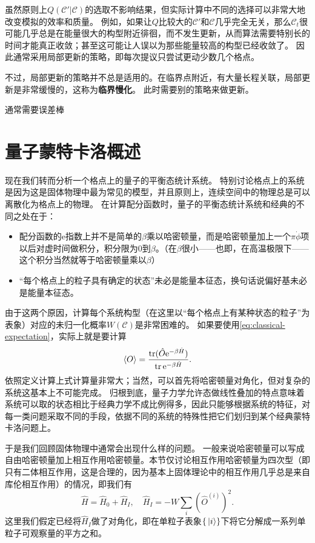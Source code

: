 \documentclass[hyperref, UTF8, a4paper]{ctexart}
\newcommand*{\ee}{\mathrm{e}}
\begin{document}
虽然原则上$Q(\mathcal{C}' | \mathcal{C})$的选取不影响结果，但实际计算中不同的选择可以非常大地改变模拟的效率和质量。
例如，如果让$Q$比较大的$\mathcal{C}'$和$\mathcal{C}$几乎完全无关，那么$\mathcal{C}_t$很可能几乎总是在能量很大的构型附近徘徊，而不发生更新，从而算法需要特别长的时间才能真正收敛；甚至这可能让人误以为那些能量较高的构型已经收敛了。
因此通常采用局部更新的策略，即每次提议只尝试更动少数几个格点。

不过，局部更新的策略并不总是适用的。在临界点附近，有大量长程关联，局部更新是非常缓慢的，这称为\textbf{临界慢化}。
此时需要别的策略来做更新。

通常需要误差棒

\section{量子蒙特卡洛概述}

现在我们转而分析一个格点上的量子的平衡态统计系统。
特别讨论格点上的系统是因为这是固体物理中最为常见的模型，并且原则上，连续空间中的物理总是可以离散化为格点上的物理。
在计算配分函数时，量子的平衡态统计系统和经典的不同之处在于：
\begin{itemize}
    \item 配分函数的$\ee$指数上并不是简单的$\beta$乘以哈密顿量，而是哈密顿量加上一个$\pi \dot{\phi}$项以后对虚时间做积分，积分限为$0$到$\beta$。（在$\beta$很小——也即，在高温极限下——这个积分当然就等于哈密顿量乘以$\beta$）
    \item “每个格点上的粒子具有确定的状态”未必是能量本征态，换句话说偏好基未必是能量本征态。
\end{itemize}
由于这两个原因，计算每个系统构型（在这里以“每个格点上有某种状态的粒子”为表象）对应的未归一化概率$W(\mathcal{C})$是非常困难的。
如果要使用\eqref{eq:classical-expectation}，实际上就是要计算
\begin{equation}
    \expval{O} = \frac{\trace(\hat{O} \ee^{-\beta \hat{H}})}{\trace \ee^{-\beta \hat{H}}}.
    \label{eq:second-quantization-expectation}
\end{equation}
依照定义计算上式计算量非常大；当然，可以首先将哈密顿量对角化，但对复杂的系统这基本上不可能完成。
归根到底，量子力学允许态做线性叠加的特点意味着系统可以取的状态相比于经典力学不成比例得多，因此只能够根据系统的特征，对每一类问题采取不同的手段，依据不同的系统的特殊性把它们划归到某个经典蒙特卡洛问题上。

于是我们回顾固体物理中通常会出现什么样的问题。
一般来说哈密顿量可以写成自由哈密顿量加上相互作用哈密顿量。本节仅讨论相互作用哈密顿量为四次型（即只有二体相互作用，这是合理的，因为基本上固体理论中的相互作用几乎总是来自库伦相互作用）的情况，即我们有
\begin{equation}
    \hat{H} = \hat{H}_0 + \hat{H}_I, \quad \hat{H}_I = - W \sum_{i} \left( \hat{O}^{(i)} \right)^2.
\end{equation}
这里我们假定已经将$\hat{H}_I$做了对角化，即在单粒子表象$\{\ket*{i}\}$下将它分解成一系列单粒子可观察量的平方之和。
\end{document}
